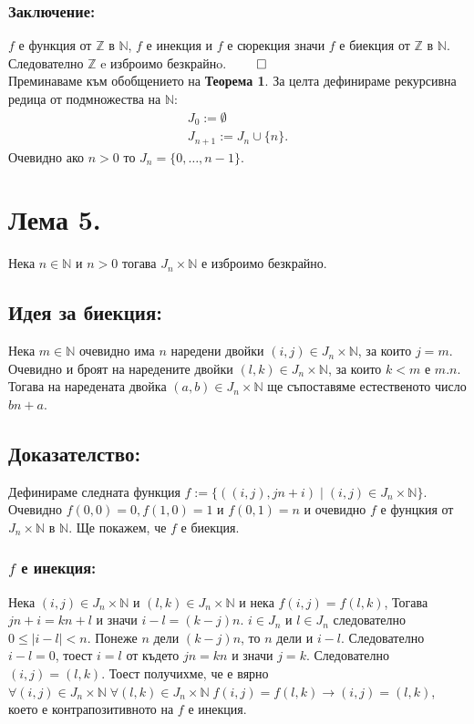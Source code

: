\documentclass[a4paper, 12pt, oneside]{article}
\newcommand{\N}{\mathbb{N}}
\newcommand{\Z}{\mathbb{Z}}
\begin{document}
\subsubsection*{Заключение:}
\(f\) е функция от \(\Z\)  в \(\N\),  \(f\) е инекция и \(f\) е сюрекция
значи \(f\) е биекция от \(\Z\)  в \(\N\). Следователно \(\Z\) e изброимо безкрайнo. \(\qed\) \\
Преминаваме към обобщението на \textbf{Теорема 1}.
За целта дефинираме рекурсивна редица от подмножества на \(\N\):
\begin{align*}
    J_0 := \emptyset \\
    J_{n + 1} := J_n \cup \{n\}.
\end{align*}
Очевидно ако \(n > 0\) то \(J_n = \{0, \dots, n - 1\}\).
\section*{Лема 5.}
Нека \(n \in \N\) и \(n > 0\) тогава \(J_n \times \N\) е изброимо безкрайно.
\subsection*{Идея за биекция:}
Нека \(m \in \N\) очевидно има \(n\) наредени двойки \((i, j) \in J_n \times \N\), за които \(j = m\).
Очевидно и броят на наредените двойки \((l, k) \in J_n \times \N\), за които \(k < m\) е \(m.n\).
Тогава на наредената двойка \((a, b) \in J_n \times \N\) ще съпоставяме естественото число \(bn + a\). 
\subsection*{Доказателство:}
Дефинираме следната функция \(f := \{((i, j), jn + i) \; | \; (i, j) \in J_n \times \N\}\).
Очевидно \(f(0, 0) = 0, f(1, 0) = 1\) и \(f(0, 1) = n\)
и очевидно \(f\) е фунцкия от \(J_n \times \N\) в \(\N\). Ще покажем, че \(f\) е биекция.
\subsubsection*{\(f\) е инекция:}
Нека \((i, j) \in J_n \times \N\) и \((l, k) \in J_n \times \N\) и нека \(f(i, j) = f(l, k)\),
Тогава \(jn + i = kn + l\) и значи \(i - l = (k - j)n\). \(i \in J_n\) и \(l \in J_n\)
следователно \(0 \leq |i - l| < n\). Понеже \(n\) дели \((k - j)n\), то \(n\) дели и \(i - l\).
Следователно \(i - l = 0\), тоест \(i = l\) от където \(jn = kn\) и значи \(j = k\).
Следователно \((i, j) = (l, k)\).
Тоест получихме, че е вярно \(\forall (i, j) \in J_n \times \N \; \forall (l, k) \in J_n \times \N \; f(i, j) = f(l, k) \longrightarrow (i, j) = (l, k)\),
което е контрапозитивното на \(f\) е инекция.
\end{document}
